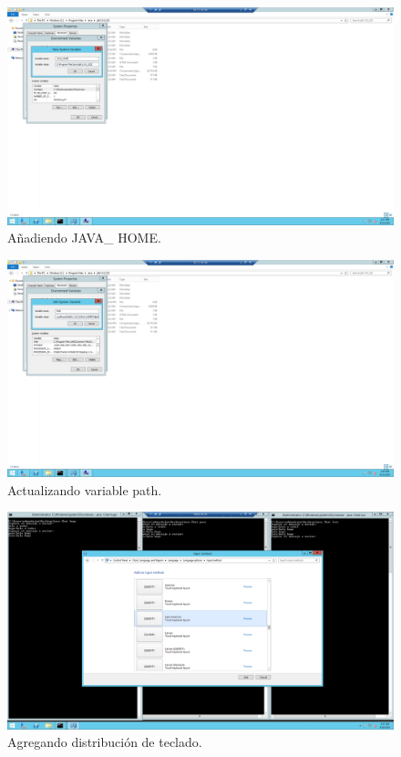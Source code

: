 \documentclass[11pt]{article}
\begin{document}
		\begin{figure}[H]
			\centering
			\includegraphics[scale=0.34]{resources/javahome.png}
			\caption{Añadiendo JAVA\_ HOME.}\label{fig:picture}
		\end{figure}
		\begin{figure}[H]
			\centering
			\includegraphics[scale=0.34]{resources/actualizapath.png}
			\caption{Actualizando variable path.}\label{fig:picture}
		\end{figure}
		\begin{figure}[H]
			\centering
			\includegraphics[scale=0.34]{resources/cambiarditribucionteclado.png}
			\caption{Agregando distribución de teclado.}\label{fig:picture}
		\end{figure}
		
\end{document}

